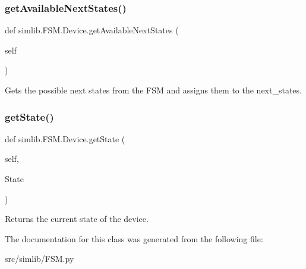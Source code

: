 \subsubsection{\texorpdfstring{get\+Available\+Next\+States()}{getAvailableNextStates()}}
{\footnotesize\ttfamily def simlib.\+F\+S\+M.\+Device.\+get\+Available\+Next\+States (\begin{DoxyParamCaption}\item[{}]{self }\end{DoxyParamCaption})}

\begin{DoxyVerb}Gets the possible next states from the FSM
and assigns them to the next_states.
\end{DoxyVerb}
 \mbox{\label{classsimlib_1_1_f_s_m_1_1_device_a2f0fc2dd8e6da5688c00ed2004538abb}} 
\subsubsection{\texorpdfstring{get\+State()}{getState()}}
{\footnotesize\ttfamily def simlib.\+F\+S\+M.\+Device.\+get\+State (\begin{DoxyParamCaption}\item[{}]{self,  }\item[{}]{State }\end{DoxyParamCaption})}

\begin{DoxyVerb}Returns the current state of the device. 
\end{DoxyVerb}
 

The documentation for this class was generated from the following file\+:\begin{DoxyCompactItemize}
\item 
src/simlib/F\+S\+M.\+py\end{DoxyCompactItemize}
